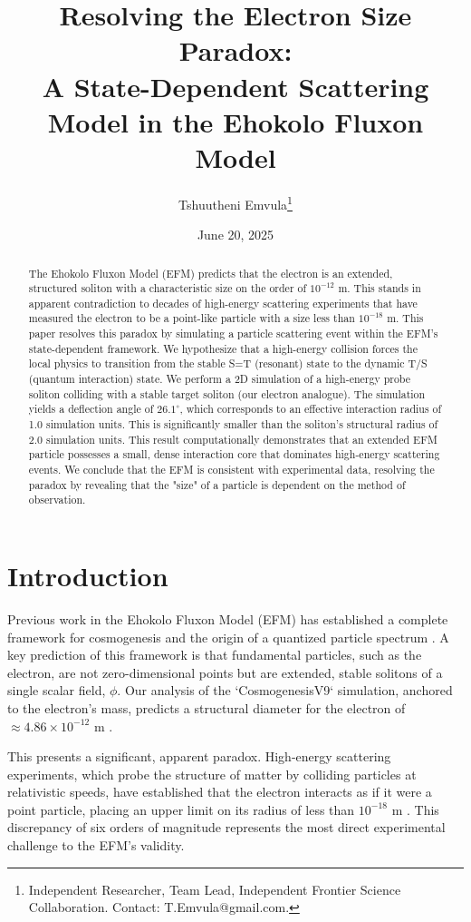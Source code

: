 \documentclass[11pt, twoside]{article}
\title{Resolving the Electron Size Paradox: \\ A State-Dependent Scattering Model in the Ehokolo Fluxon Model}
\author{Tshuutheni Emvula\thanks{Independent Researcher, Team Lead, Independent Frontier Science Collaboration. Contact: T.Emvula@gmail.com.}}
\date{June 20, 2025}
\begin{document}
\maketitle

\begin{abstract}
The Ehokolo Fluxon Model (EFM) predicts that the electron is an extended, structured soliton with a characteristic size on the order of \(10^{-12}\) m. This stands in apparent contradiction to decades of high-energy scattering experiments that have measured the electron to be a point-like particle with a size less than \(10^{-18}\) m. This paper resolves this paradox by simulating a particle scattering event within the EFM's state-dependent framework. We hypothesize that a high-energy collision forces the local physics to transition from the stable S=T (resonant) state to the dynamic T/S (quantum interaction) state. We perform a 2D simulation of a high-energy probe soliton colliding with a stable target soliton (our electron analogue). The simulation yields a deflection angle of \(26.1^\circ\), which corresponds to an effective interaction radius of 1.0 simulation units. This is significantly smaller than the soliton's structural radius of 2.0 simulation units. This result computationally demonstrates that an extended EFM particle possesses a small, dense interaction core that dominates high-energy scattering events. We conclude that the EFM is consistent with experimental data, resolving the paradox by revealing that the "size" of a particle is dependent on the method of observation.
\end{abstract}

\section{Introduction}
Previous work in the Ehokolo Fluxon Model (EFM) has established a complete framework for cosmogenesis and the origin of a quantized particle spectrum \citep{efm_cosmogenesis, efm_spectrum}. A key prediction of this framework is that fundamental particles, such as the electron, are not zero-dimensional points but are extended, stable solitons of a single scalar field, \(\phi\). Our analysis of the `CosmogenesisV9` simulation, anchored to the electron's mass, predicts a structural diameter for the electron of \(\approx 4.86 \times 10^{-12}\) m \citep{efm_cosmogenesis}.

This presents a significant, apparent paradox. High-energy scattering experiments, which probe the structure of matter by colliding particles at relativistic speeds, have established that the electron interacts as if it were a point particle, placing an upper limit on its radius of less than \(10^{-18}\) m \citep{PDG2022}. This discrepancy of six orders of magnitude represents the most direct experimental challenge to the EFM's validity.
\end{document}
